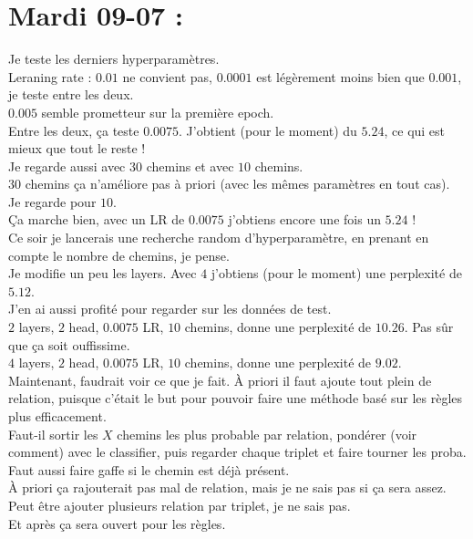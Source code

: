 \documentclass{article}
\begin{document}
\section*{Mardi 09-07 :}
Je teste les derniers hyperparamètres.\\
Leraning rate : $0.01$ ne convient pas, $0.0001$ est légèrement moins bien que $0.001$, je   teste entre les deux.\\
$0.005$ semble prometteur sur la première epoch.\\  
Entre les deux, ça teste $0.0075$. J'obtient (pour le moment) du $5.24$, ce qui est mieux que tout le reste !\\
Je regarde aussi avec $30$ chemins et avec $10$ chemins.\\
$30$ chemins ça n'améliore pas à priori (avec les mêmes paramètres en tout cas).\\
Je regarde pour $10$.\\
Ça marche bien, avec un LR de $0.0075$ j'obtiens encore une fois un $5.24$ !\\
Ce soir je lancerais une recherche random d'hyperparamètre, en prenant en compte le nombre de chemins, je pense.\\
Je modifie un peu les layers. Avec $4$ j'obtiens (pour le moment) une perplexité de $5.12$.\\
J'en ai aussi profité pour regarder sur les données de test.\\
$2$ layers, $2$ head, $0.0075$ LR, $10$ chemins, donne une perplexité de $10.26$. Pas sûr que ça soit ouffissime.\\
$4$ layers, $2$ head, $0.0075$ LR, $10$ chemins, donne une perplexité de $9.02$.\\
Maintenant, faudrait voir ce que je fait. À priori il faut ajoute tout plein de relation, puisque c'était le but pour pouvoir faire une méthode basé sur les règles plus efficacement.\\
Faut-il sortir les $X$ chemins les plus probable par relation, pondérer (voir comment) avec le classifier, puis regarder chaque triplet et faire tourner les proba.\\
Faut aussi faire gaffe si le chemin est déjà présent.\\
À priori ça rajouterait pas mal de relation, mais je ne sais pas si ça sera assez. Peut être ajouter plusieurs relation par triplet, je ne sais pas.\\
Et après ça sera ouvert pour les règles.
\end{document}
